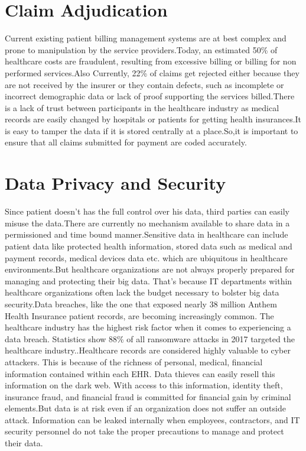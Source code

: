 \documentclass[12pt]{report}
\begin{document}
\section{Claim Adjudication}
Current existing patient billing management systems are at best complex and prone to manipulation by the service providers.Today, an estimated 50\% of healthcare costs are fraudulent, resulting from excessive
billing or billing for non performed services.Also Currently, 22\% of claims get rejected either because they are not received by the insurer or they contain defects, such as incomplete or incorrect demographic
data or lack of proof supporting the services billed\cite{7}.There is a lack of trust between participants in the healthcare industry as medical records are easily changed by hospitals or patients for getting health insurances.It is easy to tamper the data if it is stored centrally at a place.So,it is important to ensure that all
claims submitted for payment are coded accurately.
\section{Data Privacy and Security}
Since patient doesn't has the full control over his data, third parties can easily misuse the data.There are currently no mechanism available to share data in a permissioned and time bound manner.Sensitive data in healthcare can include patient data like protected health information, stored data such as medical and payment records, medical devices data etc. which are ubiquitous in healthcare environments.But healthcare organizations are not always properly prepared for managing and protecting their big data. That’s because IT departments within healthcare organizations often lack the budget necessary to bolster big data security.Data breaches, like the one that exposed nearly 38 million Anthem Health Insurance patient records, are becoming increasingly common. The healthcare industry has the highest risk factor when it comes to experiencing a data breach. Statistics show 88\% of all ransomware attacks in 2017 targeted the healthcare industry.\cite{12}.Healthcare records are considered highly valuable to cyber attackers. This is because of the richness of personal, medical, financial information contained within each EHR. Data thieves can easily resell this information on the dark web. With access to this information, identity theft, insurance fraud, and financial fraud is committed for financial gain by criminal elements.But data is at risk even if an organization does not suffer an outside attack. Information can be leaked internally when employees, contractors, and IT security personnel do not take the proper precautions to manage and protect their data.
\end{document}
